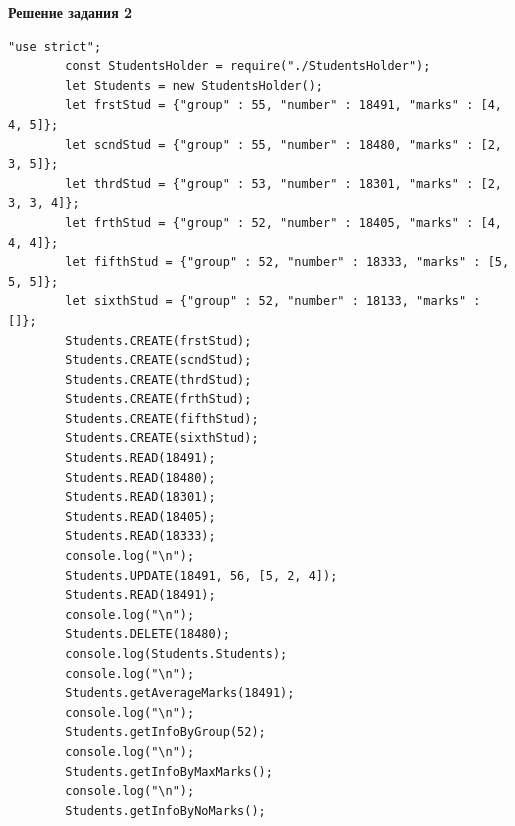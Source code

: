 \documentclass[12pt]{report}
\begin{document}
	\noindent\textbf{Решение задания 2}
	\begin{lstlisting}[label=Task1.2,caption=Файл index.js]
		"use strict";
		const StudentsHolder = require("./StudentsHolder");
		let Students = new StudentsHolder();
		let frstStud = {"group" : 55, "number" : 18491, "marks" : [4, 4, 5]};
		let scndStud = {"group" : 55, "number" : 18480, "marks" : [2, 3, 5]};
		let thrdStud = {"group" : 53, "number" : 18301, "marks" : [2, 3, 3, 4]};
		let frthStud = {"group" : 52, "number" : 18405, "marks" : [4, 4, 4]};
		let fifthStud = {"group" : 52, "number" : 18333, "marks" : [5, 5, 5]};
		let sixthStud = {"group" : 52, "number" : 18133, "marks" : []};
		Students.CREATE(frstStud);
		Students.CREATE(scndStud);
		Students.CREATE(thrdStud);
		Students.CREATE(frthStud);
		Students.CREATE(fifthStud);
		Students.CREATE(sixthStud);
		Students.READ(18491);
		Students.READ(18480);
		Students.READ(18301);
		Students.READ(18405);
		Students.READ(18333);
		console.log("\n");
		Students.UPDATE(18491, 56, [5, 2, 4]);
		Students.READ(18491);
		console.log("\n");
		Students.DELETE(18480);
		console.log(Students.Students);
		console.log("\n");
		Students.getAverageMarks(18491);
		console.log("\n");
		Students.getInfoByGroup(52);
		console.log("\n");
		Students.getInfoByMaxMarks();
		console.log("\n");
		Students.getInfoByNoMarks();	
	\end{lstlisting}
\end{document}

